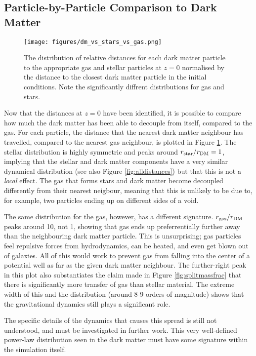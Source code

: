 \subsection{Particle-by-Particle Comparison to Dark Matter}

\begin{figure} \centering
	\texttt{[image: figures/dm\_vs\_stars\_vs\_gas.png]}
	\caption{The distribution of relative distances for each dark matter
	particle to the appropriate gas and stellar particles at $z=0$
	normalised by the distance to the closest dark matter particle in the
	initial conditions. Note the significantly diffrent distributions for
	gas and stars.} \label{fig:dmvsstarvsgas} \end{figure}

Now that the distances at $z=0$ have been identified, it is possible to compare
how much the dark matter has been able to decouple from itself, compared to the
gas. For each particle, the distance that the nearest dark matter neighbour has
travelled, compared to the nearest gas neighbour, is plotted in Figure
\ref{fig:dmvsstarvsgas}. The stellar distribution is highly symmetric and peaks
around $r_{\rm star}/r_{\rm DM} = 1$, implying that the stellar and dark matter
components have a very similar dynamical distribution (see also Figure
\ref{fig:alldistances}) but that this is not a \emph{local} effect. The gas
that forms stars and dark matter become decoupled differently from their
nearest neigbour, meaning that this is unlikely to be due to, for example, two
particles ending up on different sides of a void.

The same distribution for the gas, however, has a different signature. $r_{\rm
gas}/r_{\rm DM}$ peaks around 10, not 1, showing that gas ends up
preferrentially further away than the neighbouring dark matter particle. This
is unsurprising; gas particles feel repulsive forces from hydrodynamics, can be
heated, and even get blown out of galaxies. All of this would work to prevent
gas from falling into the center of a potential well as far as the given dark
matter neighbour. The further-right peak in this plot also substantiates the
claim made in Figure \ref{fig:splitmassfrac} that there is significantly more
transfer of gas than stellar material. The extreme width of this and the
distribution (around 8-9 orders of magnitude) shows that the gravitational
dynamics still plays a significant role.

The specific details of the dynamics that causes this spread is still not
understood, and must be investigated in further work. This very well-defined
power-law distribution seen in the dark matter must have some signature within
the simulation itself.

